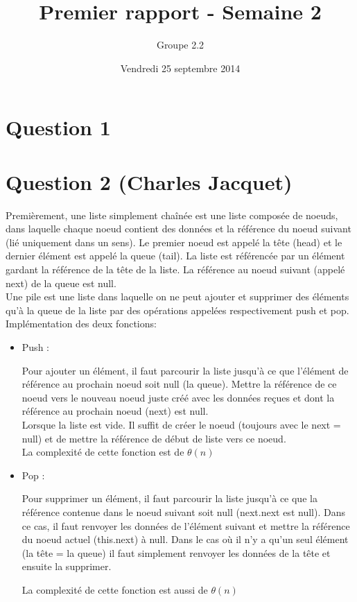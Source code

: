 \documentclass[10pt,a4paper]{article}
\date{Vendredi 25 septembre 2014}
\author{Groupe 2.2}
\title{Premier rapport - Semaine 2}
\begin{document}
\maketitle
\section*{Question 1}
\section*{Question 2 (Charles Jacquet)}
Premièrement, une liste simplement chaînée est une liste composée de noeuds, dans laquelle chaque noeud contient des données et la référence du noeud suivant (lié uniquement dans un sens). Le premier noeud est appelé la tête (head) et le dernier élément est appelé la queue (tail). La liste est référencée par un élément gardant la référence de la tête de la liste. La référence au noeud suivant (appelé next) de la queue est null.\\
Une pile est une liste dans laquelle on ne peut ajouter et supprimer des éléments qu'à la queue de la liste par des opérations appelées respectivement push et pop.\\
Implémentation des deux fonctions:
\begin{itemize}
\item {Push :}

Pour ajouter un élément, il faut parcourir la liste jusqu'à ce que l'élément de référence au prochain noeud soit null (la queue). Mettre la référence de ce noeud vers le nouveau noeud juste créé avec les données reçues et dont la référence au prochain noeud (next) est null.\\
Lorsque la liste est vide. Il suffit de créer le noeud (toujours avec le next = null) et de mettre la référence de début de liste vers ce noeud.\\
La complexité de cette fonction est de $\theta (n) $
\item {Pop : }

Pour supprimer un élément, il faut parcourir la liste jusqu'à ce que la référence contenue dans le noeud suivant soit null (next.next est null). Dans ce cas, il faut renvoyer les données de l'élément suivant et mettre la référence du noeud actuel (this.next) à null. 
Dans le cas où il n'y a qu'un seul élément (la tête = la queue) il faut simplement renvoyer les données de la tête et ensuite la supprimer.

La complexité de cette fonction est aussi de $\theta (n) $
\end{itemize}
\end{document}
